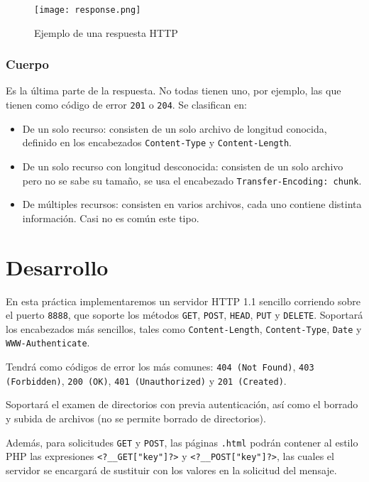 \documentclass[15pt]{article}
\begin{document}
			\begin{figure}[H]
				\centering
				\texttt{[image: response.png]}
				\caption{Ejemplo de una respuesta HTTP}
			\end{figure}
			
			\subsubsection{Cuerpo}
			Es la última parte de la respuesta. No todas tienen uno, por ejemplo, las que tienen como código de error \texttt{201} o \texttt{204}. Se clasifican en:
			\begin{itemize}
				\item De un solo recurso: consisten de un solo archivo de longitud conocida, definido en los encabezados \texttt{Content-Type} y \texttt{Content-Length}.
				\item De un solo recurso con longitud desconocida: consisten de un solo archivo pero no se sabe su tamaño, se usa el encabezado \texttt{Transfer-Encoding: chunk}.
				\item De múltiples recursos: consisten en varios archivos, cada uno contiene distinta información. Casi no es común este tipo.
			\end{itemize}
	
	\section{Desarrollo}
		En esta práctica implementaremos un servidor HTTP 1.1 sencillo corriendo sobre el puerto \texttt{8888}, que soporte los métodos \texttt{GET}, \texttt{POST}, \texttt{HEAD}, \texttt{PUT} y \texttt{DELETE}. Soportará los encabezados más sencillos, tales como \texttt{Content-Length}, \texttt{Content-Type}, \texttt{Date} y \texttt{WWW-Authenticate}.
		
		Tendrá como códigos de error los más comunes: \texttt{404 (Not Found)}, \texttt{403 (Forbidden)}, \texttt{200 (OK)}, \texttt{401 (Unauthorized)} y \texttt{201 (Created)}.
		
		Soportará el examen de directorios con previa autenticación, así como el borrado y subida de archivos (no se permite borrado de directorios).
		
		Además, para solicitudes \texttt{GET} y \texttt{POST}, las páginas \texttt{.html} podrán contener al estilo PHP las expresiones \texttt{<?\_\_GET["key"]?>} y \texttt{<?\_\_POST["key"]?>}, las cuales el servidor se encargará de sustituir con los valores en la solicitud del mensaje.
		
\end{document}
